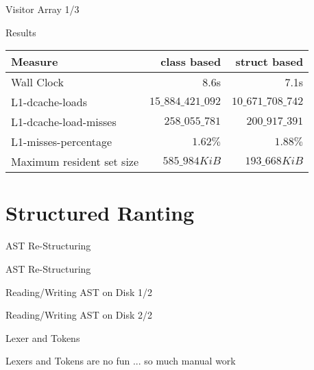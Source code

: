 \documentclass[aspectratio=169,notes]{beamer}
\begin{document}
	\begin{frame}[fragile]{Visitor Array 1/3}
		
	\end{frame}

	\begin{frame}[fragile]{Results}
		\centering
		\begin{tabular}{l r r}
			Measure & class based & struct based \\ \hline
			Wall Clock & 8.6s & 7.1s \\
			L1-dcache-loads & $15\_884\_421\_092$ & $10\_671\_708\_742$ \\
			L1-dcache-load-misses & $258\_055\_781$ & $200\_917\_391$ \\
			L1-misses-percentage & $1.62\%$ & $1.88\%$ \\
			Maximum resident set size & $585\_984 KiB$ & $193\_668 KiB$
		\end{tabular}
	\end{frame}

	\section{Structured Ranting}

	\begin{frame}[fragile]{AST Re-Structuring}
		
	\end{frame}

	\begin{frame}[fragile]{AST Re-Structuring}
		
	\end{frame}

	\begin{frame}[fragile]{Reading/Writing AST on Disk 1/2}
		
	\end{frame}

	\begin{frame}[fragile]{Reading/Writing AST on Disk 2/2}
		
	\end{frame}

	\begin{frame}[fragile]{Lexer and Tokens}
		\begin{center}
		\large
		Lexers and Tokens are no fun ... so much manual work
		\end{center}
	\end{frame}
\end{document}

